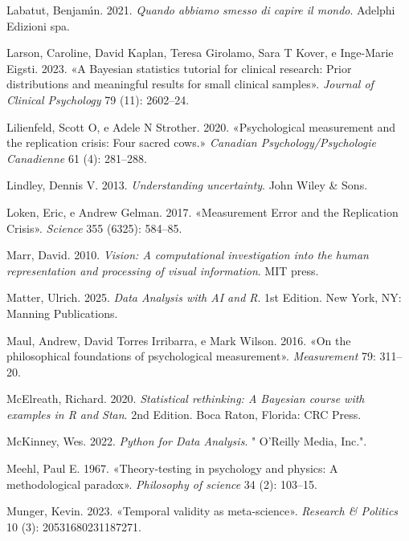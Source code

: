 \documentclass[
  letterpaper,
  krantz2]{{[}./krantz{]}}
\newlength{\cslhangindent}
\newenvironment{CSLReferences}[2] %
 {\begin{list}{}{%
  \setlength{\itemindent}{0pt}
  \setlength{\leftmargin}{0pt}
  \setlength{\parsep}{0pt}
  \ifodd #1
   \setlength{\leftmargin}{\cslhangindent}
   \setlength{\itemindent}{-1\cslhangindent}
  \fi
  \setlength{\itemsep}{#2\baselineskip}}}
 {\end{list}}
\begin{document}
\begin{CSLReferences}{1}{0}
Labatut, Benjamı́n. 2021. \emph{Quando abbiamo smesso di capire il
mondo}. Adelphi Edizioni spa.

Larson, Caroline, David Kaplan, Teresa Girolamo, Sara T Kover, e
Inge-Marie Eigsti. 2023. {«A Bayesian statistics tutorial for clinical
research: Prior distributions and meaningful results for small clinical
samples»}. \emph{Journal of Clinical Psychology} 79 (11): 2602--24.

Lilienfeld, Scott O, e Adele N Strother. 2020. {«Psychological
measurement and the replication crisis: Four sacred cows.»}
\emph{Canadian Psychology/Psychologie Canadienne} 61 (4): 281--288.

Lindley, Dennis V. 2013. \emph{Understanding uncertainty}. John Wiley \&
Sons.

Loken, Eric, e Andrew Gelman. 2017. {«Measurement Error and the
Replication Crisis»}. \emph{Science} 355 (6325): 584--85.

Marr, David. 2010. \emph{Vision: A computational investigation into the
human representation and processing of visual information}. MIT press.

Matter, Ulrich. 2025. \emph{Data Analysis with {AI} and {R}}. 1st
Edition. New York, NY: Manning Publications.

Maul, Andrew, David Torres Irribarra, e Mark Wilson. 2016. {«On the
philosophical foundations of psychological measurement»}.
\emph{Measurement} 79: 311--20.

McElreath, Richard. 2020. \emph{Statistical rethinking: {A} {Bayesian}
course with examples in {R} and {Stan}}. 2nd Edition. Boca Raton,
Florida: CRC Press.

McKinney, Wes. 2022. \emph{Python for Data Analysis}. " O'Reilly Media,
Inc.".

Meehl, Paul E. 1967. {«Theory-testing in psychology and physics: A
methodological paradox»}. \emph{Philosophy of science} 34 (2): 103--15.

Munger, Kevin. 2023. {«Temporal validity as meta-science»}.
\emph{Research \& Politics} 10 (3): 20531680231187271.


\end{CSLReferences}
\end{document}
